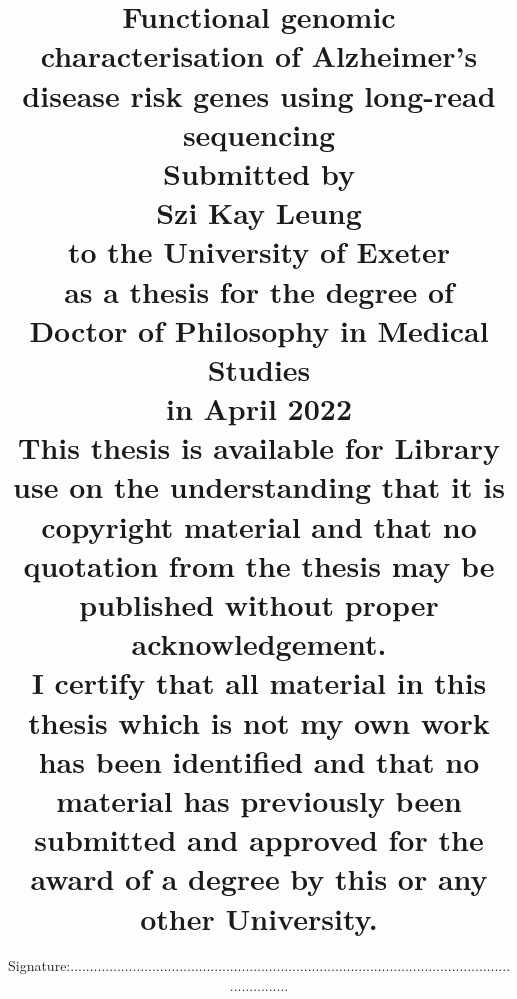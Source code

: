 \sloppy %
\title{
	{\textbf{Functional genomic characterisation of Alzheimer’s disease risk genes using long-read sequencing}}\\
	\vspace{3cm}
	{\large Submitted by}\\
	{\large Szi Kay Leung}\\
	{\large to the University of Exeter}\\
	{\large as a thesis for the degree of}\\
	{\large Doctor of Philosophy in Medical Studies}\\
	{\large in April 2022}\\
	\vspace{2cm}
	{\large This thesis is available for Library use on the understanding that it is copyright material and that no quotation from the thesis may be published without proper acknowledgement.}\\
	\vspace{2cm}
	{\large I certify that all material in this thesis which is not my own work has been identified and that no material has previously been submitted and approved for the award of a degree by this or any other University.}\\
}


\date{Signature:................................................................................................................................}